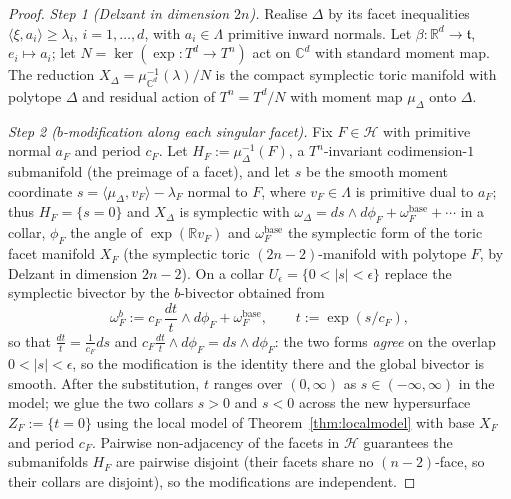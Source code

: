 \documentclass{amsart}
\theoremstyle{definition}
\begin{document}
\begin{proof}
\emph{Step 1 (Delzant in dimension $2n$).} Realise $\Delta$ by its facet
inequalities $\langle\xi,a_i\rangle\ge\lambda_i$, $i=1,\dots,d$, with
$a_i\in\Lambda$ primitive inward normals. Let $\beta\colon\mathbb R^d\to
\mathfrak t$, $e_i\mapsto a_i$; let $N=\ker(\exp\colon T^d\to T^n)$ act on
$\mathbb C^d$ with standard moment map. The reduction
$X_\Delta=\mu_{\mathbb C^d}^{-1}(\lambda)/N$ is the compact symplectic toric
manifold with polytope $\Delta$ and residual action of $T^n=T^d/N$ with moment
map $\mu_\Delta$ onto $\Delta$.

\emph{Step 2 ($b$-modification along each singular facet).} Fix $F\in\mathcal H$
with primitive normal $a_F$ and period $c_F$. Let $H_F:=\mu_\Delta^{-1}(F)$, a
$T^n$-invariant codimension-$1$ submanifold (the preimage of a facet), and let
$s$ be the smooth moment coordinate $s=\langle\mu_\Delta,v_F\rangle-\lambda_F$
normal to $F$, where $v_F\in\Lambda$ is primitive dual to $a_F$; thus $H_F=
\{s=0\}$ and $X_\Delta$ is symplectic with $\omega_\Delta=ds\wedge d\phi_F+
\omega_F^{\mathrm{base}}+\cdots$ in a collar, $\phi_F$ the angle of
$\exp(\mathbb R v_F)$ and $\omega_F^{\mathrm{base}}$ the symplectic form of the
toric facet manifold $X_F$ (the symplectic toric $(2n-2)$-manifold with polytope
$F$, by Delzant in dimension $2n-2$). On a collar
$U_\epsilon=\{0<|s|<\epsilon\}$ replace the symplectic bivector by the
$b$-bivector obtained from
\[
\omega_F^{b}:=c_F\,\frac{dt}{t}\wedge d\phi_F+\omega_F^{\mathrm{base}},\qquad
t:=\exp(s/c_F),
\]
so that $\tfrac{dt}{t}=\tfrac1{c_F}ds$ and $c_F\tfrac{dt}{t}\wedge d\phi_F=
ds\wedge d\phi_F$: the two forms \emph{agree} on the overlap $0<|s|<\epsilon$,
so the modification is the identity there and the global bivector is smooth.
After the substitution, $t$ ranges over $(0,\infty)$ as $s\in(-\infty,\infty)$
in the model; we glue the two collars $s>0$ and $s<0$ across the new
hypersurface $Z_F:=\{t=0\}$ using the local model of
Theorem~\ref{thm:localmodel} with base $X_F$ and period $c_F$. Pairwise
non-adjacency of the facets in $\mathcal H$ guarantees the submanifolds $H_F$
are pairwise disjoint (their facets share no $(n-2)$-face, so their collars are
disjoint), so the modifications are independent.


\end{proof}
\end{document}
